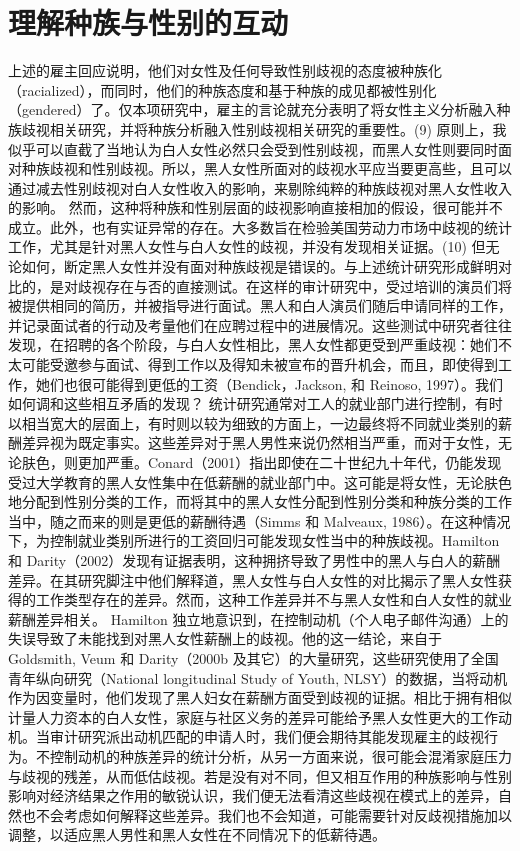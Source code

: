 \documentclass[UTF8]{ctexart}
\begin{document}
\section{理解种族与性别的互动}上述的雇主回应说明，他们对女性及任何导致性别歧视的态度被种族化（racialized），而同时，他们的种族态度和基于种族的成见都被性别化（gendered）了。仅本项研究中，雇主的言论就充分表明了将女性主义分析融入种族歧视相关研究，并将种族分析融入性别歧视相关研究的重要性。(9)
原则上，我似乎可以直截了当地认为白人女性必然只会受到性别歧视，而黑人女性则要同时面对种族歧视和性别歧视。所以，黑人女性所面对的歧视水平应当要更高些，且可以通过减去性别歧视对白人女性收入的影响，来剔除纯粹的种族歧视对黑人女性收入的影响。
然而，这种将种族和性别层面的歧视影响直接相加的假设，很可能并不成立。此外，也有实证异常的存在。大多数旨在检验美国劳动力市场中歧视的统计工作，尤其是针对黑人女性与白人女性的歧视，并没有发现相关证据。(10)
但无论如何，断定黑人女性并没有面对种族歧视是错误的。与上述统计研究形成鲜明对比的，是对歧视存在与否的直接测试。在这样的审计研究中，受过培训的演员们将被提供相同的简历，并被指导进行面试。黑人和白人演员们随后申请同样的工作，并记录面试者的行动及考量他们在应聘过程中的进展情况。这些测试中研究者往往发现，在招聘的各个阶段，与白人女性相比，黑人女性都更受到严重歧视：她们不太可能受邀参与面试、得到工作以及得知未被宣布的晋升机会，而且，即使得到工作，她们也很可能得到更低的工资（Bendick，Jackson, 和 Reinoso, 1997）。我们如何调和这些相互矛盾的发现？
统计研究通常对工人的就业部门进行控制，有时以相当宽大的层面上，有时则以较为细致的方面上，一边最终将不同就业类别的薪酬差异视为既定事实。这些差异对于黑人男性来说仍然相当严重，而对于女性，无论肤色，则更加严重。Conard（2001）指出即使在二十世纪九十年代，仍能发现受过大学教育的黑人女性集中在低薪酬的就业部门中。这可能是将女性，无论肤色地分配到性别分类的工作，而将其中的黑人女性分配到性别分类和种族分类的工作当中，随之而来的则是更低的薪酬待遇（Simms 和 Malveaux, 1986）。在这种情况下，为控制就业类别所进行的工资回归可能发现女性当中的种族歧视。Hamilton 和 Darity（2002）发现有证据表明，这种拥挤导致了男性中的黑人与白人的薪酬差异。在其研究脚注中他们解释道，黑人女性与白人女性的对比揭示了黑人女性获得的工作类型存在的差异。然而，这种工作差异并不与黑人女性和白人女性的就业薪酬差异相关。
Hamilton 独立地意识到，在控制动机（个人电子邮件沟通）上的失误导致了未能找到对黑人女性薪酬上的歧视。他的这一结论，来自于 Goldsmith, Veum 和 Darity（2000b 及其它）的大量研究，这些研究使用了全国青年纵向研究（National longitudinal Study of Youth, NLSY）的数据，当将动机作为因变量时，他们发现了黑人妇女在薪酬方面受到歧视的证据。相比于拥有相似计量人力资本的白人女性，家庭与社区义务的差异可能给予黑人女性更大的工作动机。当审计研究派出动机匹配的申请人时，我们便会期待其能发现雇主的歧视行为。不控制动机的种族差异的统计分析，从另一方面来说，很可能会混淆家庭压力与歧视的残差，从而低估歧视。若是没有对不同，但又相互作用的种族影响与性别影响对经济结果之作用的敏锐认识，我们便无法看清这些歧视在模式上的差异，自然也不会考虑如何解释这些差异。我们也不会知道，可能需要针对反歧视措施加以调整，以适应黑人男性和黑人女性在不同情况下的低薪待遇。
\end{document}
